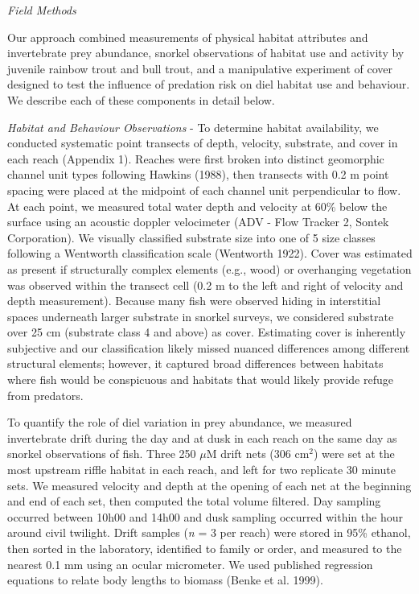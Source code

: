 \documentclass[]{article}
\begin{document}
\emph{Field Methods}

Our approach combined measurements of physical habitat attributes and
invertebrate prey abundance, snorkel observations of habitat use and
activity by juvenile rainbow trout and bull trout, and a manipulative
experiment of cover designed to test the influence of predation risk on
diel habitat use and behaviour. We describe each of these components in
detail below.

\emph{Habitat and Behaviour Observations} - To determine habitat
availability, we conducted systematic point transects of depth,
velocity, substrate, and cover in each reach (Appendix 1). Reaches were
first broken into distinct geomorphic channel unit types following
Hawkins (1988), then transects with 0.2 m point spacing were placed at
the midpoint of each channel unit perpendicular to flow. At each point,
we measured total water depth and velocity at 60\% below the surface
using an acoustic doppler velocimeter (ADV - Flow Tracker 2, Sontek
Corporation). We visually classified substrate size into one of 5 size
classes following a Wentworth classification scale (Wentworth 1922).
Cover was estimated as present if structurally complex elements (e.g.,
wood) or overhanging vegetation was observed within the transect cell
(0.2 m to the left and right of velocity and depth measurement). Because
many fish were observed hiding in interstitial spaces underneath larger
substrate in snorkel surveys, we considered substrate over 25 cm
(substrate class 4 and above) as cover. Estimating cover is inherently
subjective and our classification likely missed nuanced differences
among different structural elements; however, it captured broad
differences between habitats where fish would be conspicuous and
habitats that would likely provide refuge from predators.

To quantify the role of diel variation in prey abundance, we measured
invertebrate drift during the day and at dusk in each reach on the same
day as snorkel observations of fish. Three 250 \(\mu\)M drift nets (306
cm\(^2\)) were set at the most upstream riffle habitat in each reach,
and left for two replicate 30 minute sets. We measured velocity and
depth at the opening of each net at the beginning and end of each set,
then computed the total volume filtered. Day sampling occurred between
10h00 and 14h00 and dusk sampling occurred within the hour around civil
twilight. Drift samples (\emph{n} = 3 per reach) were stored in 95\%
ethanol, then sorted in the laboratory, identified to family or order,
and measured to the nearest 0.1 mm using an ocular micrometer. We used
published regression equations to relate body lengths to biomass (Benke
et al. 1999).
\end{document}
